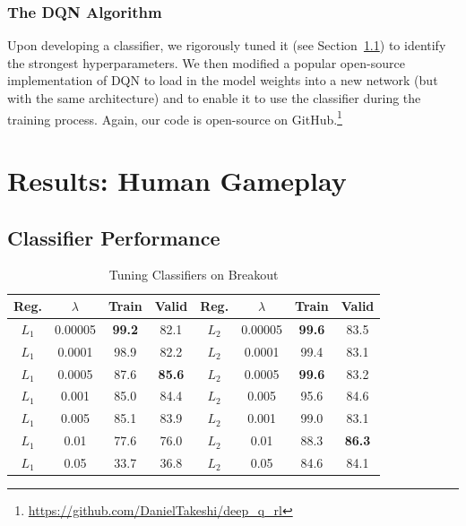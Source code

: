 \documentclass[letterpaper, 10pt, conference]{ieeeconf}
\begin{document}
\subsubsection{The DQN Algorithm} Upon developing a classifier, we rigorously
tuned it (see Section~\ref{ssec:results_classifier}) to identify the strongest
hyperparameters. We then modified a popular open-source implementation of DQN to
load in the model weights into a new network (but with the same architecture)
and to enable it to use the classifier during the training process. Again, our
code is open-source on
GitHub.\footnote{\url{https://github.com/DanielTakeshi/deep_q_rl}}



\section{Results: Human Gameplay}\label{sec:results_p1}

\subsection{Classifier Performance}\label{ssec:results_classifier}

\begin{table}[!t]
\renewcommand{\arraystretch}{1.3}
\caption{Tuning Classifiers on Breakout}
\label{tab:breakout}
\centering
\begin{tabular}{c c c c | c c c c}
\hline
Reg.  & $\lambda$ & Train & Valid & Reg.  & $\lambda$ & Train & Valid \\
\hline
$L_1$ & 0.00005   & \textbf{99.2}  & 82.1  & $L_2$ & 0.00005   & \textbf{99.6}  & 83.5 \\
$L_1$ & 0.0001    & 98.9  & 82.2  & $L_2$ & 0.0001    & 99.4  & 83.1 \\
$L_1$ & 0.0005    & 87.6  & \textbf{85.6}  & $L_2$ & 0.0005    & \textbf{99.6}  & 83.2 \\
$L_1$ & 0.001     & 85.0  & 84.4  & $L_2$ & 0.005     & 95.6  & 84.6 \\
$L_1$ & 0.005     & 85.1  & 83.9  & $L_2$ & 0.001     & 99.0  & 83.1 \\
$L_1$ & 0.01      & 77.6  & 76.0  & $L_2$ & 0.01      & 88.3  & \textbf{86.3} \\
$L_1$ & 0.05      & 33.7  & 36.8  & $L_2$ & 0.05      & 84.6  & 84.1 \\
\hline
\end{tabular}
\end{table}
\end{document}
